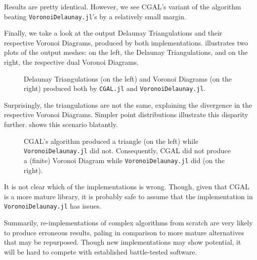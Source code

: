 Results are pretty identical.  However, we see \ac{CGAL}'s variant of the
algorithm beating \texttt{VoronoiDelaunay.jl}'s by a relatively small margin.

Finally, we take a look at the output Delaunay Triangulations and their
respective Voronoi Diagrams, produced by both implementations.
 illustrates two plots of the output meshes: on
the left, the Delaunay Triangulations, and on the right, the respective dual
Voronoi Diagrams.

\begin{figure}[htb]
  \resizebox{\linewidth}{!}{}
  \caption{\label{fig:eval.voronoi.output}
    Delaunay Triangulations (on the left) and Voronoi Diagrams (on the right)
    produced both by \texttt{CGAL.jl} and \texttt{VoronoiDelaunay.jl}.}%
\end{figure}

Surprisingly, the triangulations are not the same, explaining the divergence in
the respective Voronoi Diagrams.  Simpler point distributions illustrate this
disparity further.   shows this scenario
blatantly.

\begin{figure}[htb]
  \resizebox{\linewidth}{!}{}
  \caption[Surprising Voronoi Delaunay output]{
    \ac{CGAL}'s algorithm produced a triangle (on the left) while
    \texttt{VoronoiDelaunay.jl} did not.  Consequently, \ac{CGAL} did not
    produce a (finite) Voronoi Diagram while \texttt{VoronoiDelaunay.jl} did (on
    the right).}%
  \label{fig:eval.voronoi.surprising}
\end{figure}

It is not clear which of the implementations is wrong.  Though, given that
\ac{CGAL} is a more mature library, it is probably safe to assume that the
implementation in \texttt{VoronoiDelaunay.jl} has issues.

Summarily, re-implementations of complex algorithms from scratch are very likely
to produce erroneous results, paling in comparison to more mature alternatives
that may be repurposed.  Though new implementations may show potential, it will
be hard to compete with established battle-tested software.
